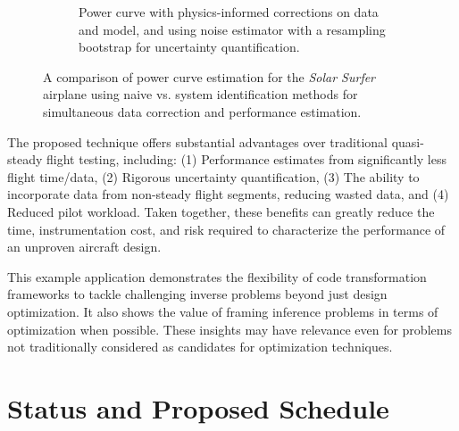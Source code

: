 \documentclass[12pt,vi,oneside,table]{report}
\begin{document}
\begin{figure}[htbp!]
\begin{subfigure}[b]{0.8\textwidth}
            \caption{Power curve with physics-informed corrections on data and model, and using noise estimator with a resampling bootstrap for uncertainty quantification.}
            \label{fig:power_curve_with_physics}
        \end{subfigure}

        \caption{A comparison of power curve estimation for the \textit{Solar Surfer} airplane using naive vs. system identification methods for simultaneous data correction and performance estimation.}
        \label{fig:power_curve_comparison}
    \end{figure}

    The proposed technique offers substantial advantages over traditional quasi-steady flight testing, including: (1) Performance estimates from significantly less flight time/data, (2) Rigorous uncertainty quantification, (3) The ability to incorporate data from non-steady flight segments, reducing wasted data, and (4) Reduced pilot workload. Taken together, these benefits can greatly reduce the time, instrumentation cost, and risk required to characterize the performance of an unproven aircraft design.

    This example application demonstrates the flexibility of code transformation frameworks to tackle challenging inverse problems beyond just design optimization. It also shows the value of framing inference problems in terms of optimization when possible. These insights may have relevance even for problems not traditionally considered as candidates for optimization techniques.


    \chapter{Status and Proposed Schedule}
    \label{sec:status}
\end{document}
